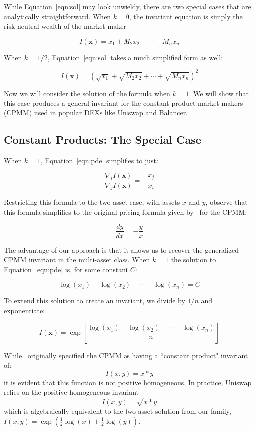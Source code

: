 \documentclass[11pt]{article}
\newcommand{\grad}{\nabla} %
\renewcommand{\vec}[1]{\mathbf{ #1 }}
\begin{document}
While Equation~\ref{eqn:sol} may look unwieldy, there are two special cases that are analytically straightforward. When $k=0$, the invariant equation is simply the risk-neutral wealth of the market maker:

\[ I(\vec{x}) = x_1 + M_2x_2 + \cdots + M_nx_n \]

When $k=1/2$, Equation~\ref{eqn:sol} takes a much simplified form as well:

\[ I(\vec{x}) = \left( \sqrt{x_1} + \sqrt{M_2x_2} + \cdots + \sqrt{M_n x_n} \right)^2 \]

Now we will consider the solution of the formula when $k=1$. We will show that this case produces a general invariant for the constant-product market makers (CPMM) used in popular DEXs like Uniswap and Balancer.

\subsection{Constant Products: The Special Case}

When $k=1$, Equation~\ref{eqn:pde} simplifies to just:

\[ \frac{\grad_i I(\vec{x}) }{\grad_j I(\vec{x})} = -\frac{x_j}{x_i} \]

Restricting this formula to the two-asset case, with assets $x$ and $y$, observe that this formula simplifies to the original pricing formula given by~\cite{buterin_2017} for the CPMM:

\[ \frac{dy}{dx} = - \frac{y}{x} \]

The advantage of our approach is that it allows us to recover the generalized CPMM invariant in the multi-asset class. When $k=1$ the solution to Equation~\ref{eqn:pde} is, for some constant $C$:

\[ \log(x_1) + \log(x_2) + \cdots + \log( x_n) = C \]

To extend this solution to create an invariant, we divide by $1/n$ and exponentiate:

\[ I(\vec{x}) = \exp\left[ \frac{\log(x_1) + \log(x_2) + \cdots + \log(x_n)}{n} \right] \]

While~\citet{buterin_2017} originally specified the CPMM as having a ``constant product" invariant of:
\[ I(x,y) = x*y \]
it is evident that this function is not positive homogeneous. In practice, Uniswap relies on the positive homogeneous invariant
\[ I(x,y) = \sqrt{x*y} \]
which is algebraically equivalent to the two-asset solution from our family, $I(x,y) = \exp\left(\frac{1}{2}\log(x) + \frac{1}{2} \log(y)\right)$.
\end{document}

